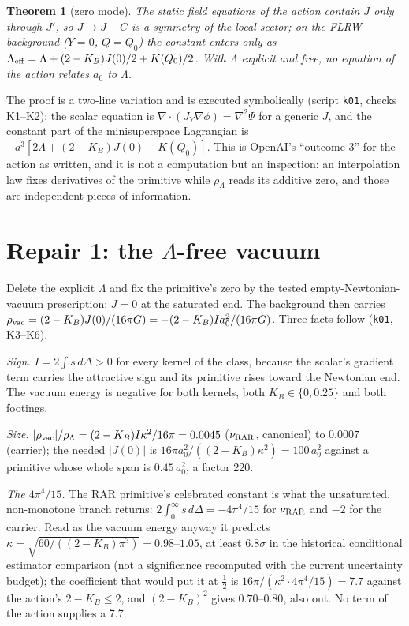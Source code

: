 \documentclass[11pt,letterpaper]{article}
\newtheorem{theorem}{Theorem}
\begin{document}
\begin{theorem}[zero mode]
The static field equations of the action contain $J$ only through $J'$, so $J\to J+C$ is a symmetry of the local sector; on the FLRW background ($Y=0$, $Q=Q_0$) the constant enters only as $\Lambda_{\rm eff}=\Lambda+(2-K_B)J(0)/2+K(Q_0)/2$. With $\Lambda$ explicit and free, no equation of the action relates $a_0$ to $\Lambda$.
\end{theorem}
The proof is a two-line variation and is executed symbolically (script \texttt{k01}, checks K1--K2): the scalar equation is $\nabla\!\cdot\!(J_Y\nabla\phi)=\nabla^2\Psi$ for a generic $J$, and the constant part of the minisuperspace Lagrangian is $-a^3[2\Lambda+(2-K_B)J(0)+K(Q_0)]$. This is OpenAI's ``outcome 3'' for the action as written, and it is not a computation but an inspection: an interpolation law fixes derivatives of the primitive while $\rho_\Lambda$ reads its additive zero, and those are independent pieces of information.

\section{Repair 1: the $\Lambda$-free vacuum}
Delete the explicit $\Lambda$ and fix the primitive's zero by the tested empty-Newtonian-vacuum prescription: $J=0$ at the saturated end. The background then carries $\rho_{\rm vac}=(2-K_B)J(0)/(16\pi G)=-(2-K_B)Ia_0^2/(16\pi G)$. Three facts follow (\texttt{k01}, K3--K6).

\emph{Sign.} $I=2\int s\,d\Delta>0$ for every kernel of the class, because the scalar's gradient term carries the attractive sign and its primitive rises toward the Newtonian end. The vacuum energy is negative for both kernels, both $K_B\in\{0,0.25\}$ and both footings.

\emph{Size.} $|\rho_{\rm vac}|/\rho_\Lambda=(2-K_B)I\kappa^2/16\pi=0.0045$ ($\nu_{\rm RAR}$, canonical) to $0.0007$ (carrier); the needed $|J(0)|$ is $16\pi a_0^2/((2-K_B)\kappa^2)=100\,a_0^2$ against a primitive whose whole span is $0.45\,a_0^2$, a factor 220.

\emph{The $4\pi^4/15$.} The RAR primitive's celebrated constant is what the unsaturated, non-monotone branch returns: $2\int_0^\infty s\,d\Delta=-4\pi^4/15$ for $\nu_{\rm RAR}$ and $-2$ for the carrier. Read as the vacuum energy anyway it predicts $\kappa=\sqrt{60/((2-K_B)\pi^3)}=0.98$--$1.05$, at least $6.8\sigma$ in the historical conditional estimator comparison (not a significance recomputed with the current uncertainty budget); the coefficient that would put it at $\tfrac12$ is $16\pi/(\kappa^2\cdot4\pi^4/15)=7.7$ against the action's $2-K_B\le2$, and $(2-K_B)^2$ gives $0.70$--$0.80$, also out. No term of the action supplies a 7.7.
\end{document}
